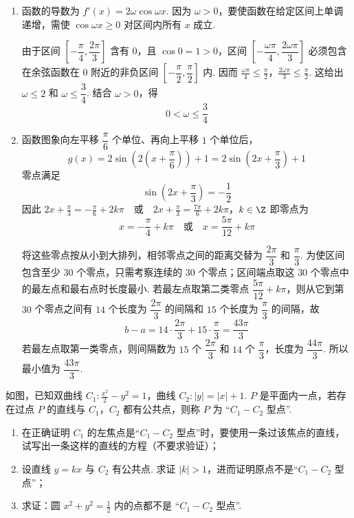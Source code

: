 \begin{solution}
\begin{enumerate}
\item 函数的导数为 \(f'(x)=2\omega\cos\omega x\). 因为 \(\omega>0\)，要使函数在给定区间上单调递增，需使 \(\cos\omega x\geqslant0\) 对区间内所有 \(x\) 成立.

由于区间 \(\left[-\dfrac{\pi}{4},\dfrac{2\pi}{3}\right]\) 含有 \(0\)，且 \(\cos0=1>0\)，区间 \(\left[-\dfrac{\omega\pi}{4},\dfrac{2\omega\pi}{3}\right]\) 必须包含在余弦函数在 \(0\) 附近的非负区间 \(\left[-\dfrac{\pi}{2},\dfrac{\pi}{2}\right]\) 内. 因而
\(\frac{\omega\pi}{4}\leqslant\frac{\pi}{2}\)，\(\frac{2\omega\pi}{3}\leqslant\frac{\pi}{2}\).
这给出 \(\omega\leqslant2\) 和 \(\omega\leqslant\dfrac{3}{4}\). 结合 \(\omega>0\)，得
\[
0<\omega\leqslant\frac{3}{4}
\]

\item 函数图象向左平移 \(\dfrac{\pi}{6}\) 个单位、再向上平移 \(1\) 个单位后，
\[
g(x)=2\sin\left(2\left(x+\frac{\pi}{6}\right)\right)+1=2\sin\left(2x+\frac{\pi}{3}\right)+1
\]
零点满足
\[
\sin\left(2x+\frac{\pi}{3}\right)=-\frac{1}{2}
\]
因此
\(2x+\frac{\pi}{3}=-\frac{\pi}{6}+2k\pi \quad\text{或}\quad 2x+\frac{\pi}{3}=\frac{7\pi}{6}+2k\pi\)，\(k\in\Z\)
即零点为
\[
x=-\frac{\pi}{4}+k\pi\quad\text{或}\quad x=\frac{5\pi}{12}+k\pi
\]

将这些零点按从小到大排列，相邻零点之间的距离交替为 \(\dfrac{2\pi}{3}\) 和 \(\dfrac{\pi}{3}\). 为使区间包含至少 \(30\) 个零点，只需考察连续的 \(30\) 个零点；区间端点取这 \(30\) 个零点中的最左点和最右点时长度最小. 若最左点取第二类零点 \(\dfrac{5\pi}{12}+k\pi\)，则从它到第 \(30\) 个零点之间有 \(14\) 个长度为 \(\dfrac{2\pi}{3}\) 的间隔和 \(15\) 个长度为 \(\dfrac{\pi}{3}\) 的间隔，故
\[
b-a=14\cdot\frac{2\pi}{3}+15\cdot\frac{\pi}{3}=\frac{43\pi}{3}
\]
若最左点取第一类零点，则间隔数为 \(15\) 个 \(\dfrac{2\pi}{3}\) 和 \(14\) 个 \(\dfrac{\pi}{3}\)，长度为 \(\dfrac{44\pi}{3}\). 所以最小值为 \(\dfrac{43\pi}{3}\).
\end{enumerate}
\end{solution}

\begin{problem}
如图，已知双曲线 \(C_1:\frac{x^2}{2}-y^2=1\)，曲线 \(C_2:|y|=|x|+1\). \(P\) 是平面内一点，若存在过点 \(P\) 的直线与 \(C_1\)，\(C_2\) 都有公共点，则称 \(P\) 为 “\(C_1-C_2\) 型点”.
\begin{enumerate}
\item 在正确证明 \(C_1\) 的左焦点是“\(C_1-C_2\) 型点”时，要使用一条过该焦点的直线，试写出一条这样的直线的方程（不要求验证）；
\item 设直线 \(y=kx\) 与 \(C_2\) 有公共点. 求证 \(|k|>1\)，进而证明原点不是“\(C_1-C_2\) 型点”；
\item 求证：圆 \(x^2+y^2=\frac{1}{2}\) 内的点都不是 “\(C_1-C_2\) 型点”.
\end{enumerate}
\end{problem}

